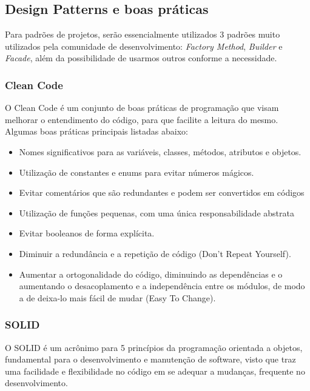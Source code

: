 \subsection{Design Patterns e boas práticas}
Para padrões de projetos, serão essencialmente utilizados 3 padrões muito utilizados pela comunidade de desenvolvimento: \emph{Factory Method}, \emph{Builder} e \emph{Facade}, além da possibilidade de usarmos outros conforme a necessidade.

\subsubsection{Clean Code}
O Clean Code é um conjunto de boas práticas de programação que visam melhorar o entendimento do código, para que facilite a leitura do mesmo. Algumas boas práticas principais listadas abaixo:

\begin{itemize}
    \item Nomes significativos para as variáveis, classes, métodos, atributos e objetos.
    \item Utilização de constantes e enums para evitar números mágicos.
    \item Evitar comentários que são redundantes e podem ser convertidos em códigos
    \item Utilização de funções pequenas, com uma única responsabilidade abstrata
    \item Evitar booleanos de forma explícita.
    \item Diminuir a redundância e a repetição de código (Don't Repeat Yourself).
    \item Aumentar a ortogonalidade do código, diminuindo as dependências e o aumentando o desacoplamento e a independência entre os módulos, de modo a de deixa-lo mais fácil de mudar (Easy To Change).
\end{itemize}

\subsubsection{SOLID}

O SOLID é um acrônimo para 5 princípios da programação orientada a objetos, fundamental para o desenvolvimento e manutenção de software, visto que traz uma facilidade e flexibilidade no código em se adequar a mudanças, frequente no desenvolvimento.

